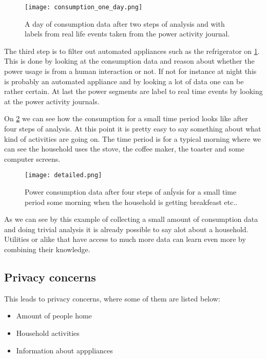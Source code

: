 \begin{figure}
  \begin{center}
    \texttt{[image: consumption\_one\_day.png]}
  \end{center}
  \caption{A day of consumption data after two steps of analysis and with labels from real life events taken from the power activity journal.}
  \label{consumption_one_day}
\end{figure}


The third step is to filter out automated appliances such as the refrigerator on \cref{consumption_one_day}.
This is done by looking at the consumption data and reason about whether the power usage is from a human interaction or not.
If not for instance at night this is probably an automated appliance and by looking a lot of data one can be rather certain.
At last the power segments are label to real time events by looking at the power activity journals.


On \cref{detailed_consumption} we can see how the consumption for a small time period looks like after four steps of analysis.
At this point it is pretty easy to say something about what kind of activities are going on.
The time period is for a typical morning where we can see the household uses the stove, the coffee maker, the toaster and some computer screens.

\begin{figure}
  \begin{center}
    \texttt{[image: detailed.png]}
  \end{center}
  \caption{Power consumption data after four steps of anĺysis for a small time period some morning when the household is getting breakfeast etc..}
  \label{detailed_consumption}
\end{figure}


As we can see by this example of collecting a small amount of consumption data and doing trivial analysis it is already possible to say alot about a household.
Utilities or alike that have access to much more data can learn even more by combining their knowledge.

\subsection{Privacy concerns}\label{privacy_concerns}
This leads to privacy concerns, where some of them are listed below:
\begin{itemize}
  \item Amount of people home
  \item Household activities
  \item Information about apppliances
\end{itemize}

